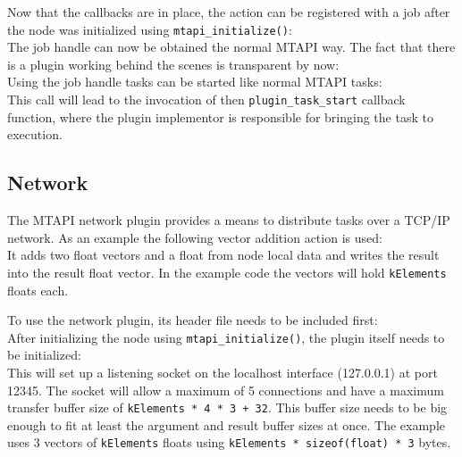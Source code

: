 Now that the callbacks are in place, the action can be registered with a job after the node was initialized using \lstinline|mtapi_initialize()|:
%
\\
%
The job handle can now be obtained the normal MTAPI way. The fact that there is a plugin working behind the scenes is transparent by now:
%
\\
%
Using the job handle tasks can be started like normal MTAPI tasks:
%
\\
%
This call will lead to the invocation of then \lstinline|plugin_task_start| callback function, where the plugin implementor is responsible for bringing the task to execution.

\subsection{Network}

The MTAPI network plugin provides a means to distribute tasks over a TCP/IP network. As an example the following vector addition action is used:
%
\\
%
It adds two float vectors and a float from node local data and writes the result into the result float vector. In the example code the vectors will hold \lstinline|kElements| floats each.

To use the network plugin, its header file needs to be included first:
%
\\
%
After initializing the node using \lstinline|mtapi_initialize()|, the plugin itself needs to be initialized:
%
\\
%
This will set up a listening socket on the localhost interface (127.0.0.1) at port 12345. The socket will allow a maximum of 5 connections and have a maximum transfer buffer size of \lstinline|kElements * 4 * 3 + 32|. This buffer size needs to be big enough to fit at least the argument and result buffer sizes at once. The example uses 3 vectors of \lstinline|kElements| floats using \lstinline|kElements * sizeof(float) * 3| bytes.

